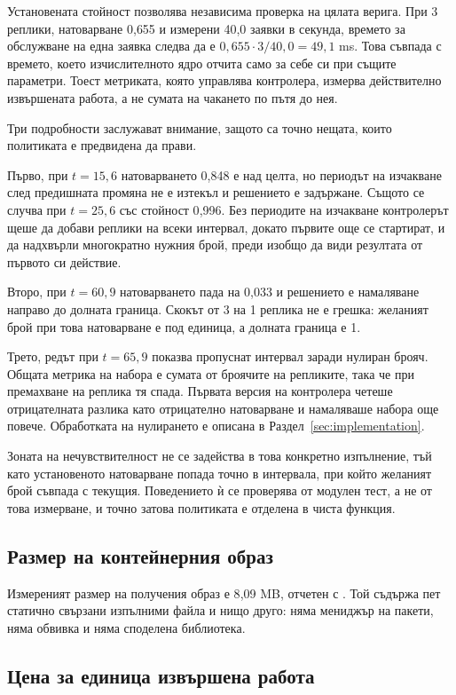 Установената стойност позволява независима проверка на цялата верига. При 3 реплики,
натоварване 0{,}655 и измерени 40{,}0 заявки в секунда, времето за обслужване на една
заявка следва да е $0{,}655 \cdot 3 / 40{,}0 = 49{,}1$ ms. Това съвпада с времето, което
изчислителното ядро отчита само за себе си при същите параметри. Тоест метриката, която
управлява контролера, измерва действително извършената работа, а не сумата на чакането по
пътя до нея.

Три подробности заслужават внимание, защото са точно нещата, които политиката е
предвидена да прави.

Първо, при $t = 15{,}6$ натоварването 0{,}848 е над целта, но периодът на изчакване след
предишната промяна не е изтекъл и решението е задържане. Същото се случва при
$t = 25{,}6$ със стойност 0{,}996. Без периодите на изчакване контролерът щеше да добави
реплики на всеки интервал, докато първите още се стартират, и да надхвърли многократно
нужния брой, преди изобщо да види резултата от първото си действие.

Второ, при $t = 60{,}9$ натоварването пада на 0{,}033 и решението е намаляване направо до
долната граница. Скокът от 3 на 1 реплика не е грешка: желаният брой при това натоварване
е под единица, а долната граница е 1.

Трето, редът при $t = 65{,}9$ показва пропуснат интервал заради нулиран брояч. Общата
метрика на набора е сумата от броячите на репликите, така че при премахване на реплика тя
спада. Първата версия на контролера четеше отрицателната разлика като отрицателно
натоварване и намаляваше набора още повече. Обработката на нулирането е описана в
Раздел~\ref{sec:implementation}.

Зоната на нечувствителност не се задейства в това конкретно изпълнение, тъй като
установеното натоварване попада точно в интервала, при който желаният брой съвпада с
текущия. Поведението ѝ се проверява от модулен тест, а не от това измерване, и точно
затова политиката е отделена в чиста функция.

\subsection{Размер на контейнерния образ}

Измереният размер на получения образ е 8{,}09 MB, отчетен с . Той
съдържа пет статично свързани изпълними файла и нищо друго: няма мениджър на пакети, няма
обвивка и няма споделена библиотека.

\subsection{Цена за единица извършена работа}

